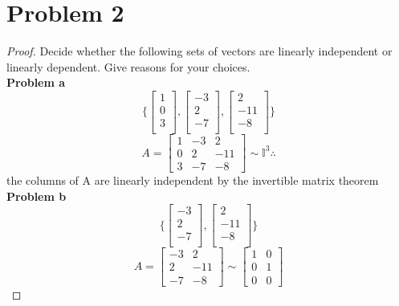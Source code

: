 \documentclass[12pt,a4paper]{article}
\begin{document}
\section*{Problem 2}
\begin{proof}
  Decide whether the following sets of vectors are linearly independent or linearly dependent.
  Give reasons for your choices.\\
  \textbf{Problem a}\\
  \[
    \Bigg\{
    \begin{bmatrix}
        1\\
        0\\
        3\\
    \end{bmatrix}
    ,\begin{bmatrix}
      -3\\
      2\\
      -7\\
    \end{bmatrix}
    ,\begin{bmatrix}
      2\\
      -11\\
      -8\\
    \end{bmatrix}
    \Bigg\}
  \]
  \[
    A=\begin{bmatrix}
      1 & -3 & 2 \\
      0 & 2 & -11 \\
      3 & -7 & -8
    \end{bmatrix}
    \sim
    \mathbb{I}^3\therefore
  \]
   the columns of A are linearly independent by the invertible matrix theorem\\
  \textbf{Problem b}\\
  \[
    \Bigg\{
    \begin{bmatrix}
        -3\\
        2\\
        -7\\
    \end{bmatrix}
    ,\begin{bmatrix}
      2\\
      -11\\
      -8\\
    \end{bmatrix}
    \Bigg\}
  \]
  \[
    A=\begin{bmatrix}
      -3 &2 \\
      2& -11
    \\ -7 & -8
  \end{bmatrix}\sim \begin{bmatrix}
    1 &0 \\
    0& 1
  \\ 0 & 0
  \end{bmatrix}
  \]


\end{proof}
\end{document}
